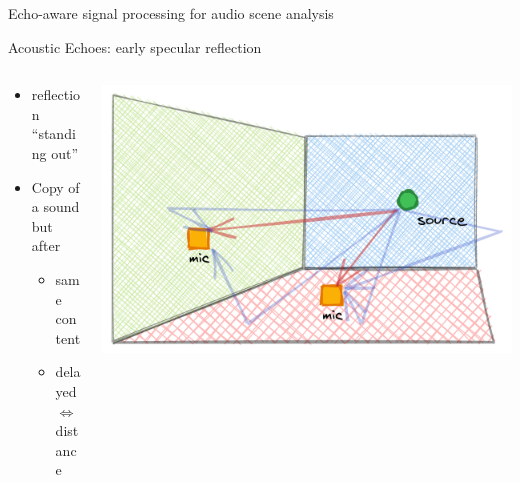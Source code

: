 \begin{frame}[t]{\alert{Echo-aware} signal processing for audio scene analysis}

    \begin{mydefblock}{Acoustic Echoes: early specular reflection}

        \vspace{-2mm}
        \begin{columns}[onlytextwidth]
            \begin{column}{0.58\textwidth}
                \begin{itemize}
                    \item reflection ``standing out''
                    \item Copy of a sound but after
                    \begin{itemize}
                        \item same content
                        \item delayed $\Leftrightarrow$ distance
                    \end{itemize}
                \end{itemize}
            \end{column}
            \begin{column}{0.40\textwidth}
                \centering
                \includegraphics[width=\textwidth]{figures/echoes}
            \end{column}

        \end{columns}
    \end{mydefblock}
\end{frame}

